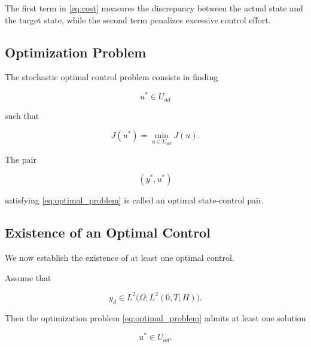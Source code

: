 The first term in \eqref{eq:cost} measures the discrepancy between the actual state and 
the target state, while the second term penalizes excessive control effort.

\subsection{Optimization Problem}

The stochastic optimal control problem consists in finding

\[
u^\ast\in U_{ad}
\]

such that

\begin{equation}
J(u^\ast)
=
\min_{u\in U_{ad}}
J(u).
\label{eq:optimal_problem}
\end{equation}

The pair

\[
(y^\ast,u^\ast)
\]

satisfying \eqref{eq:optimal_problem} is called an optimal state-control pair.

\subsection{Existence of an Optimal Control}

We now establish the existence of at least one optimal control.

\begin{theorem}
Assume that

\[
y_d
\in
L^2
\bigl(
\Omega;
L^2(0,T;H)
\bigr).
\]

Then the optimization problem \eqref{eq:optimal_problem} admits at least one solution

\[
u^\ast\in U_{ad}.
\]
\label{thm:optimal_control}
\end{theorem}

